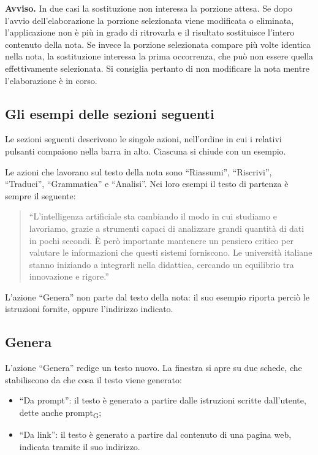 \documentclass[a4paper, 10pt]{article}
\begin{document}
\vspace{0.5em}

\noindent
\textbf{Avviso.} In due casi la sostituzione non interessa la porzione attesa. Se dopo l'avvio dell'elaborazione la porzione selezionata viene modificata o eliminata, l'applicazione non è più in grado di ritrovarla e il risultato sostituisce l'intero contenuto della nota. Se invece la porzione selezionata compare più volte identica nella nota, la sostituzione interessa la prima occorrenza, che può non essere quella effettivamente selezionata. Si consiglia pertanto di non modificare la nota mentre l'elaborazione è in corso.

\subsection{Gli esempi delle sezioni seguenti}
\label{sec:testo-esempio}
Le sezioni seguenti descrivono le singole azioni, nell'ordine in cui i relativi pulsanti compaiono nella barra in alto. Ciascuna si chiude con un esempio.

Le azioni che lavorano sul testo della nota sono ``Riassumi'', ``Riscrivi'', ``Traduci'', ``Grammatica'' e ``Analisi''. Nei loro esempi il testo di partenza è sempre il seguente:

\begin{quote}
``L'intelligenza artificiale sta cambiando il modo in cui studiamo e lavoriamo, grazie a strumenti capaci di analizzare grandi quantità di dati in pochi secondi. È però importante mantenere un pensiero critico per valutare le informazioni che questi sistemi forniscono. Le università italiane stanno iniziando a integrarli nella didattica, cercando un equilibrio tra innovazione e rigore.''
\end{quote}

L'azione ``Genera'' non parte dal testo della nota: il suo esempio riporta perciò le istruzioni fornite, oppure l'indirizzo indicato.

\subsection{Genera}
\label{sec:azione-genera}
L'azione ``Genera'' redige un testo nuovo. La finestra si apre su due schede, che stabiliscono da che cosa il testo viene generato:

\begin{itemize}
    \item ``Da prompt'': il testo è generato a partire dalle istruzioni scritte dall'utente, dette anche prompt\textsubscript{G};

    \item ``Da link'': il testo è generato a partire dal contenuto di una pagina web, indicata tramite il suo indirizzo.
\end{itemize}
\end{document}
